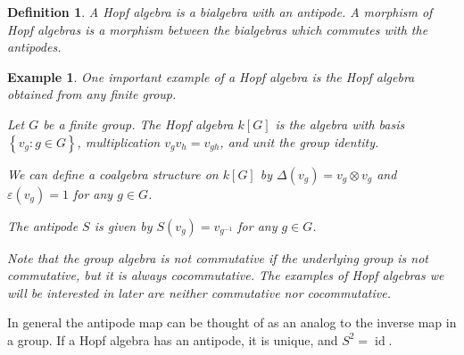 \documentclass[]{article}
\newtheorem{defn}[theorem]{Definition}
\newtheorem{example}[theorem]{Example}
\newcommand{\id}{\operatorname{id}}
\numberwithin{equation}{subsection}
\begin{document}
\begin{defn}
    A \emph{Hopf algebra} is a bialgebra with an antipode. A morphism of Hopf
    algebras is a morphism between the bialgebras which commutes with the
    antipodes. 
\end{defn}

\begin{example}
    \label{groupalgebra}
    One important example of a Hopf algebra is the Hopf algebra obtained from
    any finite group. 

    Let $G$ be a finite group. The Hopf algebra $k[G]$ is the algebra with
    basis $\left\{ v_g: g \in G \right\}$, multiplication $v_g v_h = v_{gh}$,
    and unit the group identity. 

    We can define a coalgebra structure on $k[G]$ by $\Delta(v_g) = v_g \otimes v_g$
    and $\varepsilon(v_g) = 1$ for any $g \in G$.

    The antipode $S$ is given by $S(v_g) = v_{g^{-1}}$ for any $g \in G$.

    Note that the group algebra is not commutative if the underlying group is
    not commutative, but it is always cocommutative. The examples of Hopf
    algebras we will be interested in later are neither commutative nor
    cocommutative. 
\end{example}

In general the antipode map can be thought of as an analog to the inverse map
in a group. If a Hopf algebra has an antipode, it is unique, and $S^2 = \id$.
\end{document}
